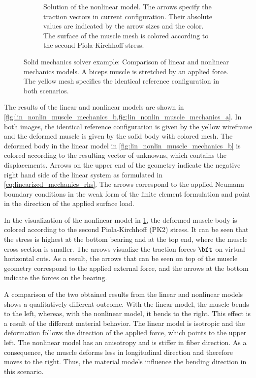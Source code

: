 \begin{figure}
\begin{subfigure}[t]{0.4\textwidth}
    \caption{Solution of the nonlinear model. The arrows specify the traction vectors in current configuration.  Their absolute values are indicated by the arrow sizes and the color. The surface of the muscle mesh is colored according to the second Piola-Kirchhoff stress.}%
    \label{fig:lin_nonlin_muscle_mechanics_a}%
  \end{subfigure}
  \hfill
  \caption{Solid mechanics solver example: Comparison of linear and nonlinear mechanics models. A biceps muscle is stretched by an applied force. The yellow mesh specifies the identical reference configuration in both scenarios.}%
  \label{fig:lin_nonlin_muscle_mechanics}%
\end{figure}%

The results of the linear and nonlinear models are shown in \cref{fig:lin_nonlin_muscle_mechanics_b,fig:lin_nonlin_muscle_mechanics_a}. 
In both images, the identical reference configuration is given by the yellow wireframe and the deformed muscle is given by the solid body with colored mesh. 
The deformed body in the linear model in \cref{fig:lin_nonlin_muscle_mechanics_b} is colored according to the resulting vector of unknowns, which contains the displacements.  Arrows on the upper end of the geometry indicate the negative right hand side of the linear system as formulated in \cref{eq:linearized_mechanics_rhs}. The arrows correspond to the applied Neumann boundary conditions in the weak form of the finite element formulation and point in the direction of the applied surface load.

In the visualization of the nonlinear model in \cref{fig:lin_nonlin_muscle_mechanics_a}, the deformed muscle body is colored according to the second Piola-Kirchhoff (PK2) stress. It can be seen that the stress is highest at the bottom bearing and at the top end, where the muscle cross section is smaller. The arrows visualize the traction forces $\bft$ on virtual horizontal cuts. As a result, the arrows that can be seen on top of the muscle geometry correspond to the applied external force, and the arrows at the bottom indicate the forces on the bearing.

A comparison of the two obtained results from the linear and nonlinear models shows a qualitatively different outcome. With the linear model, the muscle bends to the left, whereas, with the nonlinear model, it bends to the right. This effect is a result of the different material behavior. The linear model is isotropic and the deformation follows the direction of the applied force, which points to the upper left. The nonlinear model has an anisotropy and is stiffer in fiber direction. As a consequence, the muscle deforms less in longitudinal direction and therefore moves to the right.
Thus, the material models influence the bending direction in this scenario.

